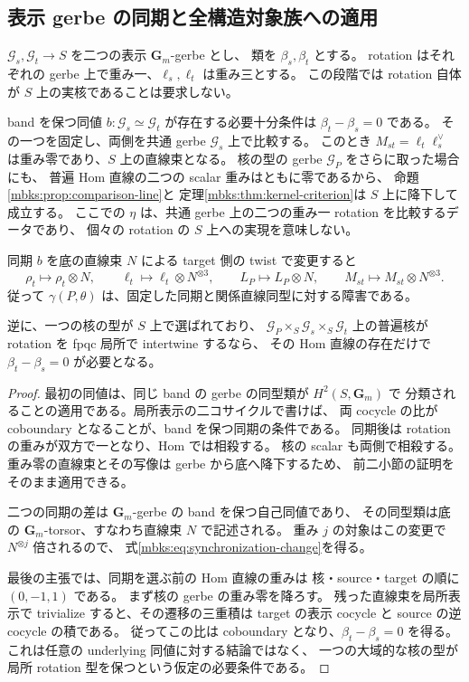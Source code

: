 \subsection{表示 gerbe の同期と全構造対象族への適用}

$\mathscr G_s,\mathscr G_t\to S$ を二つの表示 $\mathbf G_m$-gerbe とし、
類を $\beta_s,\beta_t$ とする。
rotation はそれぞれの gerbe 上で重み一、$\ell_s,\ell_t$ は重み三とする。
この段階では rotation 自体が $S$ 上の実核であることは要求しない。

\begin{proposition}
\label{mbks:prop:gerbe-synchronization}
band を保つ同値 $b:\mathscr G_s\simeq\mathscr G_t$ が存在する必要十分条件は
$\beta_t-\beta_s=0$ である。
その一つを固定し、両側を共通 gerbe $\mathscr G_s$ 上で比較する。
このとき $M_{st}=\ell_t\ell_s^\vee$ は重み零であり、$S$ 上の直線束となる。
核の型の gerbe $\mathscr G_P$ をさらに取った場合にも、
普遍 Hom 直線の二つの scalar 重みはともに零であるから、
命題\ref{mbks:prop:comparison-line}と
定理\ref{mbks:thm:kernel-criterion}は $S$ 上に降下して成立する。
ここでの $\eta$ は、共通 gerbe 上の二つの重み一 rotation を比較するデータであり、
個々の rotation の $S$ 上への実現を意味しない。

同期 $b$ を底の直線束 $N$ による target 側の twist で変更すると
\begin{equation}\label{mbks:eq:synchronization-change}
 \rho_t\longmapsto\rho_t\otimes N,\qquad
 \ell_t\longmapsto\ell_t\otimes N^{\otimes3},\qquad
 L_P\longmapsto L_P\otimes N,\qquad
 M_{st}\longmapsto M_{st}\otimes N^{\otimes3}.
\end{equation}
従って $\gamma(P,\theta)$ は、固定した同期と関係直線同型に対する障害である。

逆に、一つの核の型が $S$ 上で選ばれており、
$\mathscr G_P\times_S\mathscr G_s\times_S\mathscr G_t$ 上の普遍核が
rotation を fpqc 局所で intertwine するなら、
その Hom 直線の存在だけで $\beta_t-\beta_s=0$ が必要となる。
\end{proposition}
\begin{proof}
最初の同値は、同じ band の gerbe の同型類が $H^2(S,\mathbf G_m)$ で
分類されることの適用である。局所表示の二コサイクルで書けば、
両 cocycle の比が coboundary となることが、band を保つ同期の条件である。
同期後は rotation の重みが双方で一となり、Hom では相殺する。
核の scalar も両側で相殺する。
重み零の直線束とその写像は gerbe から底へ降下するため、
前二小節の証明をそのまま適用できる。

二つの同期の差は $\mathbf G_m$-gerbe の band を保つ自己同値であり、
その同型類は底の $\mathbf G_m$-torsor、すなわち直線束 $N$ で記述される。
重み $j$ の対象はこの変更で $N^{\otimes j}$ 倍されるので、
式\eqref{mbks:eq:synchronization-change}を得る。

最後の主張では、同期を選ぶ前の Hom 直線の重みは
核・source・target の順に $(0,-1,1)$ である。
まず核の gerbe の重み零を降ろす。
残った直線束を局所表示で trivialize すると、その遷移の三重積は
target の表示 cocycle と source の逆 cocycle の積である。
従ってこの比は coboundary となり、$\beta_t-\beta_s=0$ を得る。
これは任意の underlying 同値に対する結論ではなく、
一つの大域的な核の型が局所 rotation 型を保つという仮定の必要条件である。
\end{proof}

